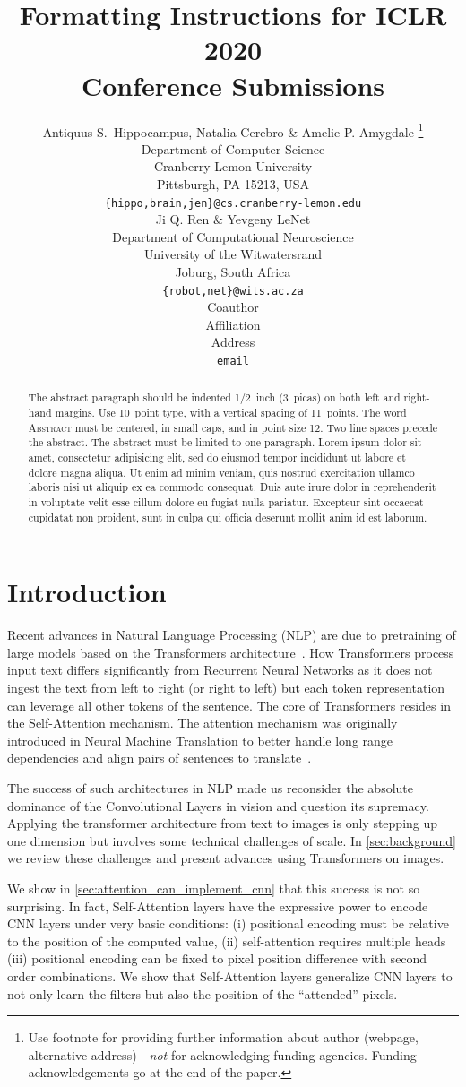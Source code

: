 \documentclass{article} %
\title{Formatting Instructions for ICLR 2020 \\ Conference Submissions}
\author{Antiquus S.~Hippocampus, Natalia Cerebro \& Amelie P. Amygdale \thanks{ Use footnote for providing further information
about author (webpage, alternative address)---\emph{not} for acknowledging
funding agencies.  Funding acknowledgements go at the end of the paper.} \\
Department of Computer Science\\
Cranberry-Lemon University\\
Pittsburgh, PA 15213, USA \\
\texttt{\{hippo,brain,jen\}@cs.cranberry-lemon.edu} \\
\And
Ji Q. Ren \& Yevgeny LeNet \\
Department of Computational Neuroscience \\
University of the Witwatersrand \\
Joburg, South Africa \\
\texttt{\{robot,net\}@wits.ac.za} \\
\AND
Coauthor \\
Affiliation \\
Address \\
\texttt{email}
}
\begin{document}
\maketitle

\begin{abstract}
The abstract paragraph should be indented 1/2~inch (3~picas) on both left and
right-hand margins. Use 10~point type, with a vertical spacing of 11~points.
The word \textsc{Abstract} must be centered, in small caps, and in point size 12. Two
line spaces precede the abstract. The abstract must be limited to one
paragraph.
Lorem ipsum dolor sit amet, consectetur adipisicing elit, sed do eiusmod
tempor incididunt ut labore et dolore magna aliqua. Ut enim ad minim veniam,
quis nostrud exercitation ullamco laboris nisi ut aliquip ex ea commodo
consequat. Duis aute irure dolor in reprehenderit in voluptate velit esse
cillum dolore eu fugiat nulla pariatur. Excepteur sint occaecat cupidatat non
proident, sunt in culpa qui officia deserunt mollit anim id est laborum.
\end{abstract}

\section{Introduction}

Recent advances in Natural Language Processing (NLP) are due to pretraining of large models based on the Transformers architecture~\citep{vaswani17attentionisallyouneed}. 
%
%
How Transformers process input text differs significantly from Recurrent Neural Networks as it does not ingest the text from left to right (or right to left) but each token representation can leverage all other tokens of the sentence.
% 
The core of Transformers resides in the Self-Attention mechanism.
%
The attention mechanism was originally introduced in Neural Machine Translation to better handle long range dependencies and align pairs of sentences to translate~\citep{Bahdanau2015attention}.

The success of such architectures in NLP made us reconsider the absolute dominance of the Convolutional Layers in vision and question its supremacy.
%
Applying the transformer architecture from text to images is only stepping up one dimension but involves some technical challenges of scale.
%
In \cref{sec:background} we review these challenges and present advances using Transformers on images.

We show in \cref{sec:attention_can_implement_cnn} that this success is not so surprising. 
%
In fact, Self-Attention layers have the expressive power to encode CNN layers under very basic conditions: (i) positional encoding must be relative to the position of the computed value, (ii) self-attention requires multiple heads (iii) positional encoding can be fixed to pixel position difference with second order combinations. %
%
We show that Self-Attention layers generalize CNN layers to not only learn the filters but also the position of the ``attended'' pixels.
\end{document}
